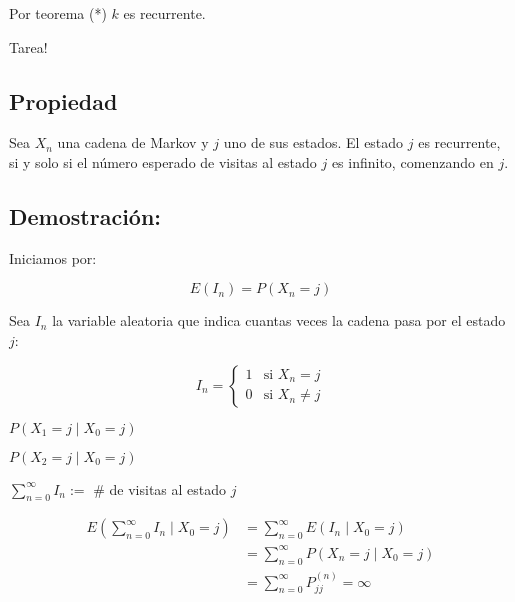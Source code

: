 \documentclass[12pt,a4paper]{article}
\begin{document}
Por teorema (*) $k$ es recurrente.

Tarea!

\subsection*{Propiedad}

Sea $X_n$ una cadena de Markov y $j$ uno de sus estados. El estado $j$ es recurrente, si y solo si el número esperado de visitas al estado $j$ es infinito, comenzando en $j$.

\subsection*{Demostración:}

Iniciamos por:

\begin{equation*}
E(I_n) = P(X_n = j)
\end{equation*}

Sea $I_n$ la variable aleatoria que indica cuantas veces la cadena pasa por el estado $j$:

\begin{equation*}
I_n = \begin{cases}
1 & \text{si } X_n=j \\
0 & \text{si } X_n \neq j
\end{cases}
\end{equation*}

$P(X_1=j \mid X_0=j)$

$P(X_2=j \mid X_0=j)$

\begin{center}
\end{center}

$\sum_{n=0}^{\infty} I_n :=$ \# de visitas al estado $j$

\begin{align*}
E\left(\sum_{n=0}^{\infty} I_n \mid X_0=j\right) &= \sum_{n=0}^{\infty} E(I_n \mid X_0=j) \\
&= \sum_{n=0}^{\infty} P(X_n=j \mid X_0=j) \\
&= \sum_{n=0}^{\infty} P_{jj}^{(n)} = \infty
\end{align*}
\end{document}
